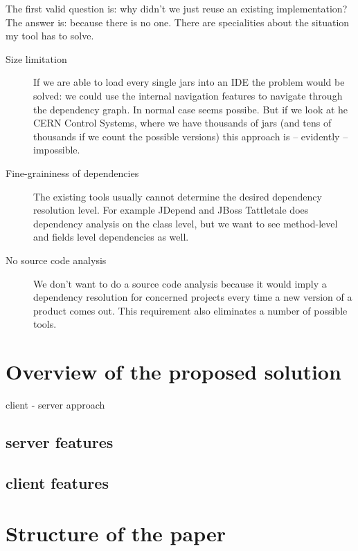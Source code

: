 The first valid question is: why didn't we just reuse an existing
implementation? The answer is: because there is no one.
There are specialities about the situation my tool has to solve.
\begin{description}
\item[Size limitation] If we are able to load every single jars into an IDE the
problem would be solved: we could use the internal navigation features to navigate 
through the dependency graph. In normal case seems possibe. 
But if we look at he CERN Control Systems, where we have thousands of jars (and tens of 
thousands if we count the possible versions) this approach is -- evidently -- impossible.   
\item[Fine-graininess of dependencies] The existing tools usually cannot determine
the desired dependency resolution level. For example JDepend \cite{JDepend} and
JBoss Tattletale \cite{Tattletale} does dependency analysis on the class level,
but we want to see method-level and fields level dependencies as well.
\item[No source code analysis] We don't want to do a source code analysis because 
it would imply a dependency resolution for concerned projects every time a new version 
of a product comes out. This requirement also eliminates a number of possible tools. 
\end{description}



\section{Overview of the proposed solution}

client - server approach

\subsection{server features}


\subsection{client features}


\section{Structure of the paper}



